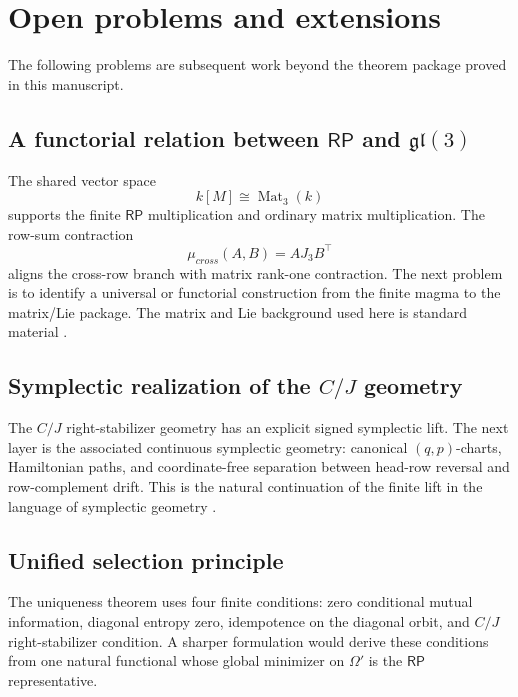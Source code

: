 \documentclass[11pt]{article}
\theoremstyle{definition}
\newcommand{\RP}{\mathsf{RP}}
\begin{document}
\section{Open problems and extensions}\label{open-problems-extensions}\label{open-problems-and-directions}

The following problems are subsequent work beyond the theorem package proved in
this manuscript.

\subsection[Functorial RP--gl(3) relation]{A functorial relation between \(\RP\) and \(\mathfrak{gl}(3)\)}\label{functorial-rp-gl3-relation}

The shared vector space
\[
k[M]\cong\operatorname{Mat}_3(k)
\]
supports the finite \(\RP\) multiplication and ordinary matrix multiplication.
The row-sum contraction
\[
\mu_{cross}(A,B)=AJ_3B^\top
\]
aligns the cross-row branch with matrix rank-one contraction.  The next
problem is to identify a universal or functorial construction from the finite
magma to the matrix/Lie package.  The matrix and Lie background used here is
standard material \cite{HornJohnson2012,FultonHarris1991,Hall2015}.

\subsection[Symplectic realization of the C/J geometry]{Symplectic realization of the \(C/J\) geometry}\label{symplectic-realization-cj-geometry}

The \(C/J\) right-stabilizer geometry has an explicit signed symplectic lift.  The
next layer is the associated continuous symplectic geometry: canonical
\((q,p)\)-charts, Hamiltonian paths, and coordinate-free separation between
head-row reversal and row-complement drift.  This is the natural continuation of
the finite lift in the language of symplectic geometry
\cite{GuilleminSternberg1990,McDuffSalamon2017}.

\subsection{Unified selection principle}\label{unified-selection-principle}

The uniqueness theorem uses four finite conditions: zero conditional mutual information, diagonal
entropy zero, idempotence on the diagonal orbit, and \(C/J\) right-stabilizer condition.  A sharper formulation
would derive these conditions from one natural functional whose global minimizer
on \(\Omega'\) is the \(\RP\) representative.
\end{document}

